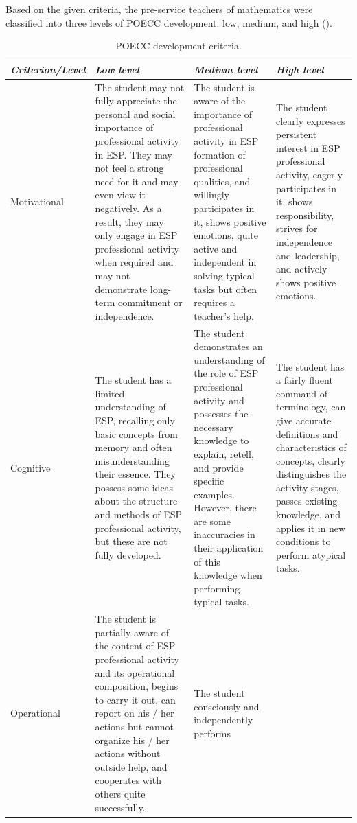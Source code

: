 Based on the given criteria, the pre-service teachers of mathematics were classified into three levels of POECC development: low, medium, and high ().

\begin{table}[htpb]
\centering
\caption{POECC development criteria.}
\label{tab-02}
\begin{threeparttable}
\begin{tabular}{ l p{4cm} p{4cm} p{4cm}}
\toprule
\emph{Criterion/Level} & \emph{Low level} & \emph{Medium level} & \emph{High level} \\
\midrule
Motivational & The student may not fully appreciate the personal and
social importance of professional activity in ESP. They may not feel a
strong need for it and may even view it negatively. As a result, they
may only engage in ESP professional activity when required and may not
demonstrate long-term commitment or independence. & The student is aware
of the importance of professional activity in ESP formation of
professional qualities, and willingly participates in it, shows positive
emotions, quite active and independent in solving typical tasks but
often requires a teacher's help. & The student clearly expresses
persistent interest in ESP professional activity, eagerly 
participates in it, shows responsibility, strives for independence and
leadership, and actively shows positive emotions. \\
Cognitive & The student has a limited understanding of ESP, recalling
only basic concepts from memory and often misunderstanding their
essence. They possess some ideas about the structure and methods of ESP
professional activity, but these are not fully developed. & The student
demonstrates an understanding of the role of ESP professional activity
and possesses the necessary knowledge to explain, retell, and provide
specific examples. However, there are some inaccuracies in their
application of this knowledge when performing typical tasks. & The
student has a fairly fluent command of terminology, can give accurate
definitions and characteristics of concepts, clearly distinguishes the
activity stages, passes existing knowledge, and applies it in new
conditions to perform atypical tasks. \\
Operational & The student is partially aware of the content of ESP
professional activity and its operational composition, begins to carry
it out, can report on his / her actions but cannot organize his / her
actions without outside help, and cooperates with others quite
successfully. & The student consciously and independently performs

\end{tabular}
\end{threeparttable}
\end{table}
